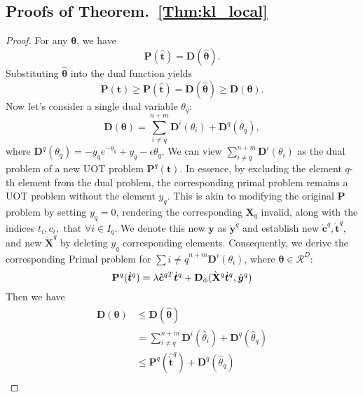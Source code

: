 \documentclass[11pt]{article}
\newcommand{\mat}[1]{\mathbf{#1}}
\renewcommand{\vec}[1]{\bm{#1}}
\begin{document}
\subsection{Proofs of Theorem.~\ref{Thm:kl_local}}
\begin{proof}
\label{P:bound}
For any $\vec \theta$, we have
\begin{equation*}
\mat P(\hat{\vec t}) = \mat D(\hat {\vec{\theta}}).
\end{equation*}
Substituting $\hat{\vec{\theta}}$ into the dual function yields
\begin{equation*}
\mat P({\vec t}) \geq \mat P(\hat{\vec t}) = \mat D(\hat{\vec\theta}) \geq \mat D(\vec\theta).
\end{equation*}
Now let's consider a single dual variable $\theta_q$:
\begin{equation*}
\mat D(\vec\theta) =\sum_{i\neq q}^{n+m} \mat D^{i}(\theta_i) + \mat D^{q}(\theta_q),
\end{equation*}
where $\mat{D}^{q}(\theta_q) = -y_q e^{-\theta_q} + y_q - \epsilon \theta_q$. We can view $\sum_{i \neq q}^{n+m} \mat{D}^{i}(\theta_i)$ as the dual problem of a new UOT problem $\mat{P}^q(\vec{t})$. In essence, by excluding the element $q$-th element from the dual problem, the corresponding primal problem remains a UOT problem without the element $y_q$. This is akin to modifying the original $\mat{P}$ problem by setting $y_q = 0$, rendering the corresponding $\mat{X}_q$ invalid, along with the indices $t_i, c_i, \text{ that } \forall i \in I_q$. We denote this new $\vec{y}$ as $\grave{\vec{y}}^q$ and establish new $\grave{\vec{c}}^{q}, \grave{\vec{t}}^{q}$, and new $\grave{\mat{X}}^q$ by deleting $y_q$ corresponding elements. Consequently, we derive the corresponding Primal problem for $\sum{i \neq q}^{n+m} \mat{D}^{i}(\theta_i)$, where $\vec{\theta} \in \mathcal{R}^D$:
\begin{equation*}
\mat P^{q}(\grave{\vec t}^{q}) = \lambda {\vec\grave{\vec c}^{qT}}\grave{\vec t}^{q} + \mat D_\phi(\grave{\mat{X}}^q\grave{\vec t}^{q},\grave{\vec y}^q)
\end{equation*}
Then we have
\begin{equation}
\begin{split}
\mat D(\vec\theta) &\leq \mat D(\hat{\vec\theta})\\
& = \sum_{i\neq q}^{n+m} \mat D^{i}(\hat{\theta}_i) + \mat D^{q}(\hat{\theta}_q)\\
& \leq \mat P^{q}({\hat{\grave{\vec t}}^{q}}) + \mat D^{q}(\hat{\theta}_q)\\

\end{split}
\end{equation}
\end{proof}
\end{document}
